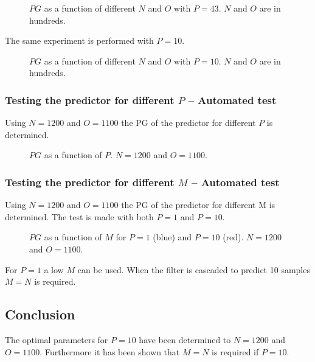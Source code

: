 \begin{figure}[H]
	\centering
	
	\caption{$PG$ as a function of different $N$ and $O$ with $P=43$. $N$ and $O$ are in hundreds.}
	\label{fig:Predict43App}
\end{figure}

The same experiment is performed with $P=10$.
\begin{figure}[H]
	\centering
	
	\caption{$PG$ as a function of different $N$ and $O$ with $P=10$. $N$ and $O$ are in hundreds.}
	\label{fig:Predict10App}
\end{figure}


\subsubsection{Testing the predictor for different $P$ -- Automated test}
Using $N=1200$ and $O=1100$ the PG of the predictor for different $P$ is determined. 
\begin{figure}[H]
	\centering
	
	\caption{$PG$ as a function of $P$. $N=1200$ and $O=1100$.}
	\label{fig:PredictPApp}
\end{figure}

\subsubsection{Testing the predictor for different $M$ -- Automated test}
Using $N=1200$ and $O=1100$ the PG of the predictor for different M is determined. The test is made with both $P=1$ and $P=10$. 
\begin{figure}[H]
	\centering
	
	\caption{$PG$ as a function of $M$ for $P=1$ (blue) and $P=10$ (red).  $N=1200$ and $O=1100$.}
	\label{fig:PredictMApp}
\end{figure}
For $P=1$ a low $M$ can be used. When the filter is cascaded to predict 10 samples $M=N$ is required. 

\subsection{Conclusion}
The optimal parameters for $P=10$ have been determined to $N=1200$ and $O=1100$. Furthermore it has been shown that $M=N$ is required if $P=10$. 
